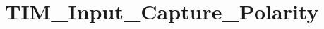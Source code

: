 \hypertarget{group___t_i_m___input___capture___polarity}{\section{T\-I\-M\-\_\-\-Input\-\_\-\-Capture\-\_\-\-Polarity}
\label{group___t_i_m___input___capture___polarity}
}
